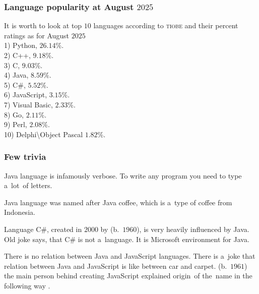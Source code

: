 \documentclass[10pt,t]{beamer}
\begin{document}
\begin{frame}
  \frametitle{Language popularity at August $2025$}


  It is worth to look at top $10$ languages according to \textsc{tiobe}
  and their percent ratings as for August $2025$ \\
  1) Python, $26.14 \text{\%}$. \\
  2) C++, $9.18 \text{\%}$. \\
  3) C, $9.03 \text{\%}$. \\
  4) Java, $8.59 \text{\%}$. \\
  5) C\#, $5.52 \text{\%}$. \\
  6) JavaScript, $3.15 \text{\%}$. \\
  7) Visual Basic, $2.33 \text{\%}$. \\
  8) Go, $2.11 \text{\%}$. \\
  9) Perl, $2.08 \text{\%}$. \\
  10) Delphi\textbackslash Object Pascal $1.82 \text{\%}$.

\end{frame}





\begin{frame}
  \frametitle{Few trivia}


  Java language is infamously verbose. To write any program you need to type
  a~lot~of letters.

  Java language was named after Java coffee, which is a~type of coffee
  from
  {Indonesia}.

  Language
  {C\#}, created in $2000$ by
   (b.~$1960$), is very heavily influenced by Java. Old joke
  says, that C\# is not a~language. It is Microsoft environment for Java.

  There is no relation between Java and JavaScript languages. There is
  a~joke that relation between \alert{Java} and \alert{Java}Script is like
  between \alert{car} and \alert{car}pet.
  (b.~$1961$) the main person behind creating JavaScript explained
  origin~of the~name in the following way
  \parencite{Fin-JS-Brendan-Eich-CEO-of-Brave-Ver-2016}.

\end{frame}
\end{document}
